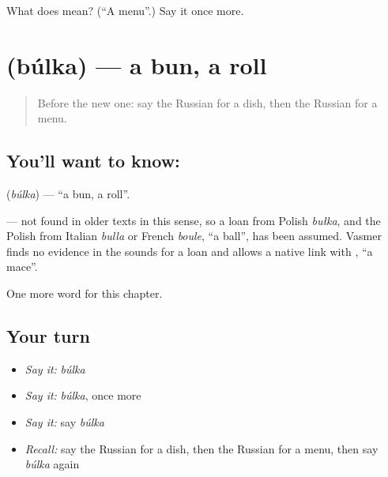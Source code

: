 \begin{tcolorbox}[breakable,colback=teal!4,colframe=teal!35!black,title={Before you move on}]
What does  mean? (\textquotedblleft{}A menu\textquotedblright{}.) Say it once more.
\end{tcolorbox}
\section[\texorpdfstring{\ru{булка} (búlka)}{булка (búlka)}]{ (búlka) — a bun, a roll}

\label{lesson:RU-C222-bulka}



\begin{quote}
Before the new one: say the Russian for a dish, then the Russian for a menu.
\end{quote}

\subsection*{You'll want to know: }
\textbf{} (\emph{búlka}) — \textquotedblleft{}a bun, a roll\textquotedblright{}.

\begin{cousinweb}
\textbf{} — not found in older texts in this sense, so a loan from Polish \emph{bułka}, and the Polish from Italian \emph{bulla} or French \emph{boule}, \textquotedblleft{}a ball\textquotedblright{}, has been assumed. Vasmer finds no evidence in the sounds for a loan and allows a native link with \emph{}, \textquotedblleft{}a mace\textquotedblright{}.
\end{cousinweb}

\begin{grammarlens}[title={What you've built}]
One more word for this chapter.
\end{grammarlens}

\subsection*{Your turn}
\begin{itemize}
\raggedright
  \item \emph{Say it:} \emph{búlka}
  \item \emph{Say it:} \emph{búlka}, once more
  \item \emph{Say it:} say \emph{búlka}
  \item \emph{Recall:} say the Russian for a dish, then the Russian for a menu, then say \emph{búlka} again
\end{itemize}

